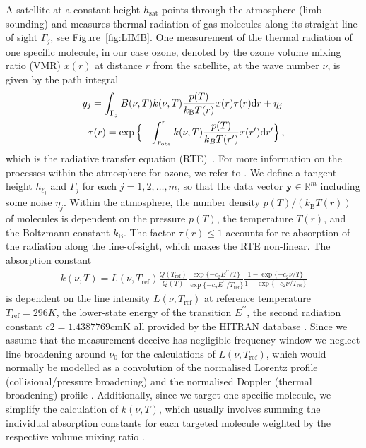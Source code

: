 A satellite at a constant height $h_{\text{sat}}$ points through the atmosphere (limb-sounding) and measures thermal radiation of gas molecules along its straight line of sight $\Gamma_j$, see  Figure~\ref{fig:LIMB}.
One measurement of the thermal radiation of one specific molecule, in our case ozone, denoted by the ozone volume mixing ratio (VMR) $x(r)$ at distance $r$ from the satellite, at the wave number $\nu$, is given by the path integral
\begin{align}
	\label{eq:RTE} 
	y_j =   \int_{\Gamma_j}  B(\nu,T) k(\nu, T)   \frac{p(T)}{k_{\text{B}} T(r)}  x(r)  \tau(r) \text{d}r + \eta_j \, \\
	\tau(r) = \exp{ \Bigl\{ - \int^{r}_{r_\text{obs}}  k(\nu, T)   \frac{p(T)}{k_B T(r^{\prime})}  x(r^{\prime}) \text{d}r^{\prime} \Bigr\} } \, ,\label{eq:absRTE} 
\end{align}
which is the radiative transfer equation (RTE)~\cite{mipas2000handbook}.
For more information on the processes within the atmosphere for ozone, we refer to \cite{Lee2020NightOzone}.
We define a tangent height $h_{\ell_j}$ and $\Gamma_j$ for each $j=1,2,\ldots,m$, so that the data vector $\bm{y} \in \mathbb{R}^m$ including some noise $\eta_j$.
Within the atmosphere, the number density $p(T) / (k_{\text{B}} T(r))$ of molecules is dependent on the pressure $p(T)$, the temperature $T(r)$, and the Boltzmann constant $k_{\text{B}}$.
The factor $\tau(r)\leq 1$ accounts for re-absorption of the radiation along the line-of-sight, which makes the RTE non-linear.
The absorption constant
\begin{align}
	k(\nu, T) = L(\nu, T_{\text{ref}}) \frac{Q(T_{\text{ref}})}{Q(T)} \frac{ \exp{\{ - c_2 E^{\prime \prime} / T\}} }{\exp{\{ - c_2 E^{\prime \prime} / T_{\text{ref}} \}}} \frac{ 1- \exp{\{ - c_2 \nu  / T \}} }{1 - \exp{\{ - c_2 \nu / T_{\text{ref}} \}}}
\end{align}
is dependent on the line intensity $L(\nu, T_{\text{ref}})$ at reference temperature $T_{\text{ref}} =296K $, the lower-state energy of the transition $ E^{\prime \prime} $, the second radiation constant $c2=1.4387769\text{cmK}$ all provided by the HITRAN database \cite{gordon2022hitran2020}.
Since we assume that the measurement deceive has negligible frequency window we neglect line broadening around $\nu_0$ for the calculations of $L(\nu, T_{\text{ref}})$, which would normally be modelled as a convolution of the normalised Lorentz profile (collisional/pressure broadening) and the normalised Doppler (thermal broadening) profile \cite{mipas2000handbook}.
Additionally, since we target one specific molecule, we simplify the calculation of $k(\nu, T)$, which usually involves summing the individual absorption constants for each targeted molecule weighted by the respective volume mixing ratio \cite{mipas2000handbook}.
